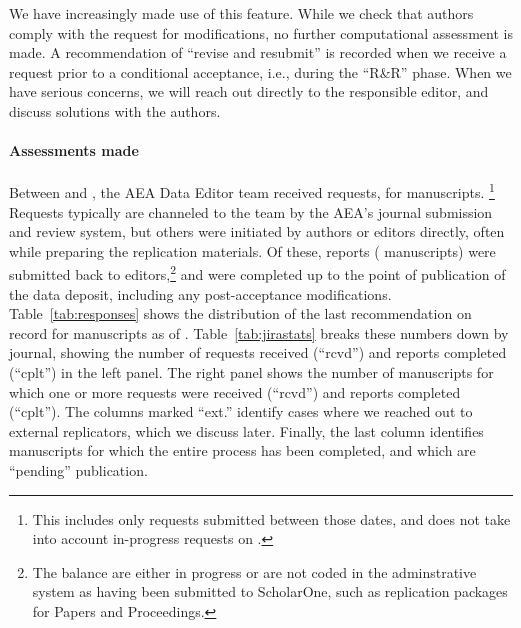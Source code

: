 \begin{center}
	\label{tab:responses}
	\centering
	
 \end{center}

We have increasingly made use of this feature. While we check that authors comply with the request for modifications, no further computational assessment is made. A recommendation of  ``revise and resubmit'' is recorded when we receive a request prior to a conditional acceptance, i.e., during the ``R\&R'' phase. When we have serious concerns, we will reach out directly to the responsible editor, and discuss solutions with the authors. 

\paragraph{Assessments made}

Between \firstday{} and \lastday{}, the AEA Data Editor team  received
\jiraissues{} requests,  for \jiramcs{} manuscripts.%
%
\footnote{This includes only requests submitted between those dates, and does not take into account in-progress requests on \firstday{}.}
%
Requests typically are channeled to the team by the AEA's journal submission and review system, but others were initiated by authors or editors directly, often while preparing the replication materials. Of these,  \jiraissuescplt{} reports (\jiramcscplt{} manuscripts) were submitted back to editors,\footnote{The balance are either in progress or are not coded in the adminstrative system as having been submitted to ScholarOne, such as replication packages for Papers and Proceedings.} and \jiramcspending{} were completed up to the point of publication of the data deposit, including any post-acceptance modifications.  Table~\ref{tab:responses} shows the distribution of the last recommendation on record for manuscripts as of \lastday{}.  Table~\ref{tab:jirastats} breaks these numbers down by journal, showing the number of requests received (``rcvd'') and  reports completed (``cplt'') in the left panel. The right panel shows the number of manuscripts for which one or more requests were received (``rcvd'') and reports completed (``cplt''). The columns marked ``ext.'' identify cases where we reached out to external replicators, which we discuss later. Finally, the last column identifies manuscripts for which the entire process has been completed, and which are ``pending'' publication.
%

